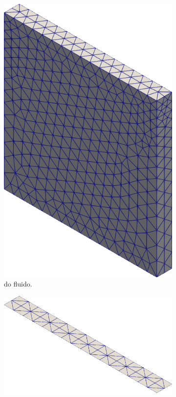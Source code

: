 \begin{figure}[h!]
    \centering
    \caption{Cavidade bidimensional - Malha utilizada para o domínio:}
    \begin{subfigure}[b]{0.32\textwidth}
        \includegraphics[width=\linewidth]{Figuras/FSI-Cavity2D/fluid-mesh.png}
        \caption{do fluido.}
    \end{subfigure}
    \begin{subfigure}[b]{0.32\textwidth}
        \includegraphics[width=\linewidth]{Figuras/FSI-Cavity2D/shell-mesh.png}

\end{subfigure}
\end{figure}
